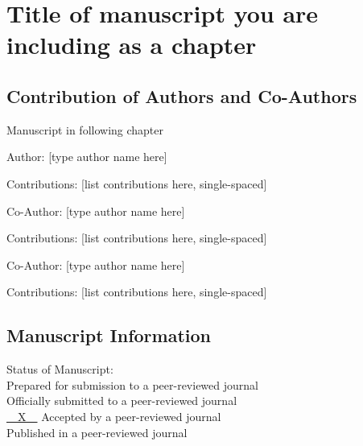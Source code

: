 
\chapter{Title of manuscript you are\\ including as a chapter}\label{CH:manuscript}

\section{Contribution of Authors and Co-Authors}

\noindent Manuscript in following chapter

\noindent Author: [type author name here]

\begin{singlespace}
  \noindent Contributions: [list contributions here, single-spaced]
\end{singlespace}

\noindent Co-Author: [type author name here]

\begin{singlespace}
  \noindent Contributions: [list contributions here, single-spaced]
\end{singlespace}

\noindent Co-Author: [type author name here]

\begin{singlespace}
  \noindent Contributions: [list contributions here, single-spaced]
\end{singlespace}


\newpage

\section{Manuscript Information}



\begin{singlespace}
  \noindent Status of Manuscript: \\ %
  \underline{\phantom{~~X~~}} Prepared for submission to a peer-reviewed journal\\
  \underline{\phantom{~~X~~}} Officially submitted to a peer-reviewed journal\\
  \underline{~~X~~} Accepted by a peer-reviewed journal\\
  \underline{\phantom{~~X~~}} Published in a peer-reviewed journal
\end{singlespace}

